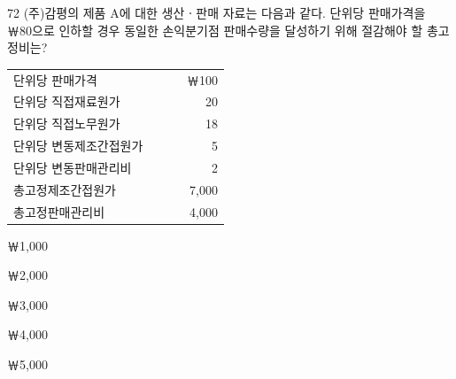 \begin{question}{72}
(주)감평의 제품 A에 대한 생산ㆍ판매 자료는 다음과 같다. 단위당 판매가격을 ￦80으로 인하할 경우 동일한 손익분기점 판매수량을 달성하기 위해 절감해야 할 총고정비는?
\begin{framedtext}
\begin{tabular}{@{}p{0.8\linewidth}r@{}}
단위당 판매가격 & ￦100 \\
단위당 직접재료원가 & 20 \\
단위당 직접노무원가 & 18 \\
단위당 변동제조간접원가 & 5 \\
단위당 변동판매관리비 & 2 \\
총고정제조간접원가 & 7,000 \\
총고정판매관리비 & 4,000 \\
\end{tabular}
\end{framedtext}
\begin{choices}
  \item ￦1,000
  \item ￦2,000
  \item ￦3,000
  \item ￦4,000
  \item ￦5,000
\end{choices}
\end{question}
